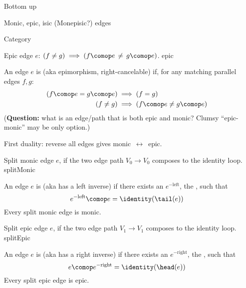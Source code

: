 \begin{plSection}{Bottom up}
\begin{plSection}{Monic, epic, isic (Monepisic?) edges}
\begin{plSection}{Category}
\begin{plDiagram}
{Epic edge $e$: 
$\left( f \neq g \right)
 \implies 
 \left( f \comop e \, \neq \, g \comop e \right)$.}
{epic}
\centering
{}
\end{plDiagram}

An edge $e$ is  (aka epimorphism, right-cancelable)
if, for any matching parallel edges $f,g$:
\begin{align*}
\left( f \comop e = g \comop e \right) 
& 
\implies 
\left( f = g \right)
\\
\left( f \neq g \right)
& 
\implies 
\left( f \comop e \neq g \comop e \right) 
\end{align*}
(\textbf{Question:} 
what is an edge/path that is both epic and monic?
Clumsy ``epic-monic'' may be only option.)

First duality: reverse all edges gives monic $\,\leftrightarrow\,$ epic.

\begin{plDiagram}
{Split monic edge $e$, if the two edge path
$V_0 \longrightarrow V_0$
composes to the identity loop.}
{splitMonic}
\centering
{}
\end{plDiagram}

An edge $e$ is  (aka has a left inverse)
if there exists an $e^{-\text{left}}$, the ,
such that
\[
e^{-\text{left}} \comop e = \identity(\tail(e))
\]
Every split monic edge is monic.

\begin{plDiagram}
{Split epic edge $e$, if the two edge path
$V_1 \longrightarrow V_1$
composes to the identity loop.}
{splitEpic}
\centering
{}
\end{plDiagram}

An edge $e$ is  (aka has a right inverse)
if there exists an $e^{-\text{right}}$, the , 
such that
\[
e \comop e^{-\text{right}} = \identity(\head(e))
\]
Every split epic edge is epic.


\end{plSection}
\end{plSection}
\end{plSection}
